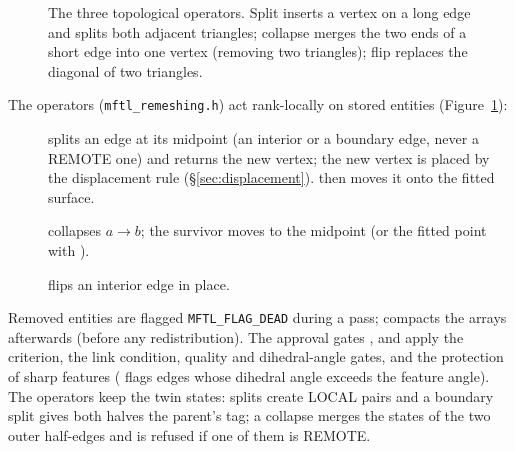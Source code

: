 \begin{figure}[ht]
\caption{The three topological operators. Split inserts a vertex on a long edge and splits both
adjacent triangles; collapse merges the two ends of a short edge into one vertex (removing two
triangles); flip replaces the diagonal of two triangles.}
\label{fig:operators}
\end{figure}

The operators (\texttt{mftl\_remeshing.h}) act rank-locally on stored entities
(Figure~\ref{fig:operators}):
\begin{description}
  \item[] splits an edge at its midpoint (an interior or a boundary edge,
    never a REMOTE one) and returns the new vertex; the new vertex is placed by the displacement
    rule (\S\ref{sec:displacement}).  then moves it onto the fitted
    surface.
  \item[] collapses $a\to b$; the survivor moves to the midpoint (or the
    fitted point with ).
  \item[] flips an interior edge in place.
\end{description}
Removed entities are flagged \texttt{MFTL\_FLAG\_DEAD} during a pass;
 compacts the arrays afterwards (before any redistribution). The
approval gates ,  and 
apply the criterion, the link condition, quality and dihedral-angle gates, and the protection
of sharp features ( flags edges whose dihedral angle exceeds the feature
angle). The operators keep the twin states: splits create LOCAL pairs and a boundary split
gives both halves the parent's tag; a collapse merges the states of the two outer
half-edges and is refused if one of them is REMOTE.

